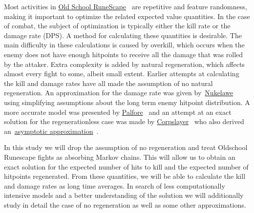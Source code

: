 Most activities in \href{https://oldschool.runescape.com}{Old School RuneScape}~\cite{osrs} are repetitive and feature randomness, making it important to optimize the related expected value quantities. In the case of combat, the subject of optimization is typically either the kill rate or the damage rate (DPS). A method for calculating these quantities is desirable. The main difficulty in these calculations is caused by overkill, which occurs when the enemy does not have enough hitpoints to receive all the damage that was rolled by the attaker. Extra complexity is added by natural regeneration, which affects almost every fight to some, albeit small extent.
Earlier attempts at calculating the kill and damage rates have all made the assumption of no natural regeneration. An approximation for the damage rate was given by~\href{https://imgur.com/aykEahg}{Nukelawe}~\cite{nukelawe} using simplifying assumptions about the long term enemy hitpoint distribution. A more accurate model was presented by \href{https://www.reddit.com/r/2007scape/comments/faz5et/the_mathematics_of_osrs_combat/}{Palfore}~\cite{palfore} and an attempt at an exact solution for the regenerationless case was made by \href{https://www.reddit.com/r/2007scape/comments/bcq3mj/overkill_dps_formulas}{Corpslayer}~\cite{corpslayer1} who also derived an~\href{https://imgur.com/a/6613Tlu}{asymptotic approximation}~\cite{corpslayer2}.

In this study we will drop the assumption of no regeneration and treat Oldschool Runescape fights as absorbing Markov chains. This will allow us to obtain an exact solution for the expected number of hits to kill and the expected number of hitpoints regenerated. From these quantities, we will be able to calculate the kill and damage rates as long time averages. In search of less computationally intensive models and a better understanding of the solution we will additionally study in detail the case of no regeneration as well as some other approximations.
